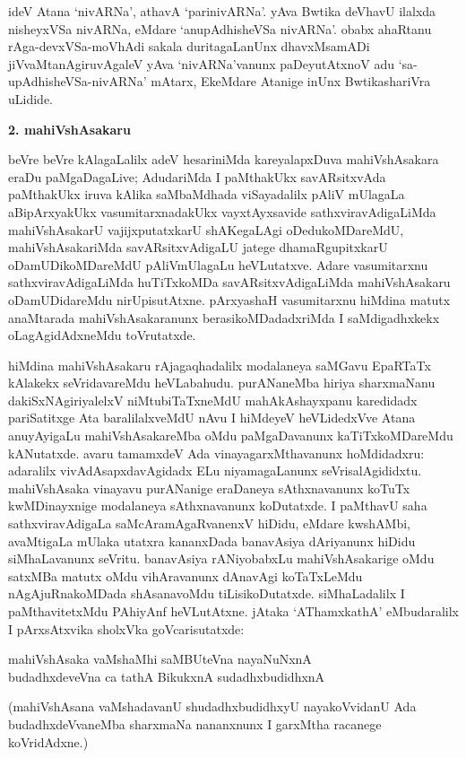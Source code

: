ideV Atana `nivARNa', athavA `parinivARNa'. yAva Bwtika deVhavU ilalxda nisheyxVSa nivARNa, eMdare `anupAdhisheVSa nivARNa'. obabx ahaRtanu rAga-devxVSa-moVhAdi sakala duritagaLanUnx dhavxMsamADi jiVvaMtanAgiruvAgaleV yAva `nivARNa'vanunx paDeyutAtxnoV adu `sa-upAdhisheVSa-nivARNa' mAtarx, EkeMdare Atanige inUnx BwtikashariVra uLidide.

\medskip

\begin{center}
{\textbf{\Large 2. mahiVshAsakaru}}
\end{center}

beVre beVre kAlagaLalilx adeV hesariniMda kareyalapxDuva mahiVshAsakara eraDu paMgaDa\-gaLive; AdudariMda I paMthakUkx savARsitxvAda paMthakUkx iruva kAlika saMbaMdhada viSayadalilx pAliV mUlagaLa aBipArxyakUkx vasumitarxnadakUkx vayxtAyxsa\-vide sathxviravAdigaLiMda mahiVshAsakarU vajijxputatxkarU shAKegaLAgi oDedukoMDa\-reMdU, mahiVshAsakariMda savARsitxvAdigaLU jatege dhamaRgupitxkarU oDamUDi\-koMDareMdU pAliVmUlagaLu heVLutatxve. Adare vasumitarxnu sathxviravAdi\-gaLiMda huTiTxkoMDa savARsitxvAdigaLiMda mahiVshAsakaru oDamUDidareMdu nirUpisutAtxne. pArxyashaH vasumitarxnu hiMdina matutx anaMtarada mahiVshAsakaranunx berasikoMDadadx\-riMda I saMdigadhxkekx oLagAgidAdxneMdu toVrutatxde.

hiMdina mahiVshAsakaru rAjagaqhadalilx modalaneya saMGavu EpaRTaTx kAlakekx seVridavareMdu heVLabahudu. purANaneMba hiriya sharxmaNanu dakiSxNAgiriyalelxV niMtubiTaTxneMdU mahAkAshayxpanu karedidadx pariSatitxge Ata baralilalxveMdU nAvu I hiMdeyeV heVLidedxVve Atana anuyAyigaLu mahiVshAsakareMba oMdu paMgaDavanunx kaTiTxkoMDareMdu kANutatxde. avaru tamamxdeV Ada vinayagarxMthavanunx hoMdidadxru: adaralilx vivAdAsapxdavAgidadx ELu niyamagaLanunx seVrisalAgididxtu. mahiVshAsaka vinayavu purANanige eraDaneya sAthxnavanunx koTuTx kwMDinayxnige modalaneya sAthxnavanunx koDutatxde. I paMthavU saha sathxviravAdigaLa saMcAramAgaRvanenxV hiDidu, eMdare kwshAMbi, avaMtigaLa mUlaka utatxra kananxDada banavAsiya dAriyanunx hiDidu siMhaLavanunx seVritu. banavAsiya rANiyobabxLu mahiVshAsakarige oMdu satxMBa matutx oMdu vihAravanunx dAnavAgi koTaTxLeMdu nAgAjuRnakoMDada shAsanavoMdu tiLisikoDutatxde. siMhaLadalilx I paMthavitetxMdu PAhiyAnf heVLutAtxne. jAtaka `AThamxkathA' eMbudaralilx I pArxsAtxvika sholxVka goVcarisutatxde:

\begin{center}
mahiVshAsaka vaMshaMhi saMBUteVna nayaNuNxnA\\
budadhxdeveVna ca tathA BikukxnA sudadhxbudidhxnA
\end{center}
(mahiVshAsana vaMshadavanU shudadhxbudidhxyU nayakoVvidanU Ada budadhxdeVvaneMba sharxmaNa nananxnunx I garxMtha racanege koVridAdxne.)

